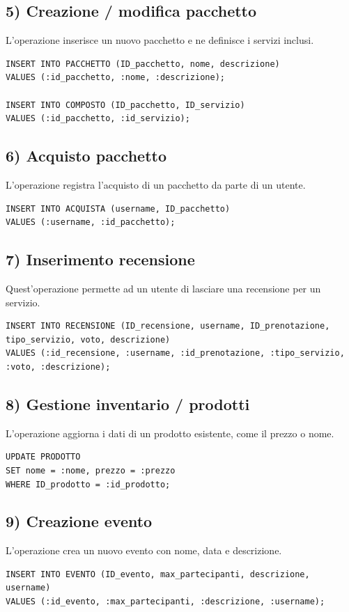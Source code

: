 \documentclass[a4paper,12pt]{report}
\begin{document}
\subsection*{5) Creazione / modifica pacchetto}
L'operazione inserisce un nuovo pacchetto e ne definisce i servizi inclusi.
\begin{verbatim}
INSERT INTO PACCHETTO (ID_pacchetto, nome, descrizione)
VALUES (:id_pacchetto, :nome, :descrizione);

INSERT INTO COMPOSTO (ID_pacchetto, ID_servizio)
VALUES (:id_pacchetto, :id_servizio);
\end{verbatim}

\subsection*{6) Acquisto pacchetto}
L'operazione registra l’acquisto di un pacchetto da parte di un utente.
\begin{verbatim}
INSERT INTO ACQUISTA (username, ID_pacchetto)
VALUES (:username, :id_pacchetto);
\end{verbatim}

\subsection*{7) Inserimento recensione}
Quest'operazione permette ad un utente di lasciare una recensione per un servizio.
\begin{verbatim}
INSERT INTO RECENSIONE (ID_recensione, username, ID_prenotazione, tipo_servizio, voto, descrizione)
VALUES (:id_recensione, :username, :id_prenotazione, :tipo_servizio, :voto, :descrizione);
\end{verbatim}

\subsection*{8) Gestione inventario / prodotti}
L'operazione aggiorna i dati di un prodotto esistente, come il prezzo o nome.
\begin{verbatim}
UPDATE PRODOTTO
SET nome = :nome, prezzo = :prezzo
WHERE ID_prodotto = :id_prodotto;
\end{verbatim}

\subsection*{9) Creazione evento}
L'operazione crea un nuovo evento con nome, data e descrizione.
\begin{verbatim}
INSERT INTO EVENTO (ID_evento, max_partecipanti, descrizione, username)
VALUES (:id_evento, :max_partecipanti, :descrizione, :username);
\end{verbatim}
\end{document}
